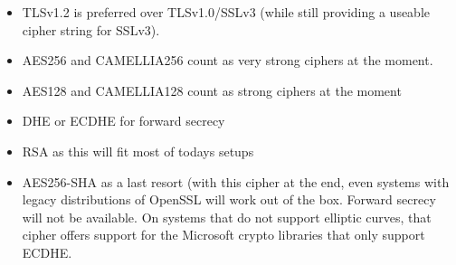 \begin{itemize}
\item TLSv1.2 is preferred over TLSv1.0/SSLv3 (while still providing a useable cipher
      string for SSLv3).
\item AES256 and CAMELLIA256 count as very strong ciphers at the moment.
\item AES128 and CAMELLIA128 count as strong ciphers at the moment
\item DHE or ECDHE for forward secrecy
\item RSA as this will fit most of todays setups
\item AES256-SHA as a last resort (with this cipher at the end, even systems with
      legacy distributions of OpenSSL will work out of the box. Forward secrecy
      will not be available. On systems that do not support elliptic curves, that cipher
      offers support for the Microsoft crypto libraries that only support ECDHE. 
\end{itemize}


